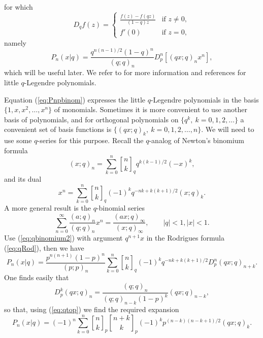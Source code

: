 \documentclass[12pt]{article}
\DeclareRobustCommand{\qbinom}{\genfrac[]{0pt}{}}
\begin{document}
for which
\begin{equation}  \label{eq:Dq}
   D_qf(z) = \begin{cases}
              {\displaystyle \frac{f(z)-f(qz)}{(1-q)z}} & \textrm{if } z\neq 0, \\
               f'(0) & \textrm{if } z = 0,
              \end{cases}
 \end{equation}                       
namely
\begin{equation}  \label{eq:qRod}
  P_n(x|q) = \frac{q^{n(n-1)/2} (1-q)^n}{(q;q)_n} D_p^n [ (qx;q)_n x^n ],
\end{equation}
which will be useful later. We refer to \cite{koek} for more information
and references for little $q$-Legendre polynomials.

Equation (\ref{eq:Pnpbinom}) expresses the little $q$-Legendre polynomials
in the basis $\{1,x,x^2,\ldots,x^n\}$ of monomials. Sometimes it is more convenient
to use another basis of polynomials, and for orthogonal polynomials  on 
$\{q^k,\ k=0,1,2,\ldots\}$ a convenient set of basis functions
is $\{(qx;q)_k,\ k=0,1,2,\ldots,n\}$. We will need to use some
$q$-series for this purpose. Recall the $q$-analog of Newton's binomium formula
\begin{equation}  \label{eq:qbinomium}
  (x;q)_n = \sum_{k=0}^n \qbinom{n}{k}_q q^{k(k-1)/2} (-x)^k ,
\end{equation}
and its dual
\begin{equation}  \label{eq:qbinomium2}
  x^n = \sum_{k=0}^n \qbinom{n}{k}_q (-1)^k q^{-nk+k(k+1)/2} (x;q)_k.   
\end{equation}
A more general result is the $q$-binomial series
\begin{equation}  \label{eq:qbinomial}
  \sum_{n=0}^\infty \frac{(a;q)_n}{(q;q)_n} x^n = \frac{(ax;q)_\infty}{(x;q)_\infty}, \qquad
  |q| < 1, |x| < 1.
\end{equation}
Use (\ref{eq:qbinomium2}) with argument $q^{n+1}x$ in  the Rodrigues
formula (\ref{eq:qRod}), then we have
\[ P_n(x|q) = \frac{p^{n(n+1)}(1-p)^n}{(p;p)_n} 
  \sum_{k=0}^n \qbinom{n}{k}_q (-1)^k q^{-nk+k(k+1)/2}
   D_p^n (qx;q)_{n+k} . \]
One finds easily that
\begin{equation}  \label{eq:Dppoch}
  D_p^k (qx;q)_n = \frac{(q;q)_n}{(q;q)_{n-k}(1-p)^k} (qx;q)_{n-k} ,
\end{equation}      
so that, using (\ref{eq:qtop}) we find the required expansion 
\begin{equation}  \label{eq:Pnpoch}
 P_n(x|q) = (-1)^n  \sum_{k=0}^n \qbinom{n}{k}_p \qbinom{n+k}{k}_p (-1)^k p^{(n-k)(n-k+1)/2} (qx;q)_k.
\end{equation}
\end{document}
